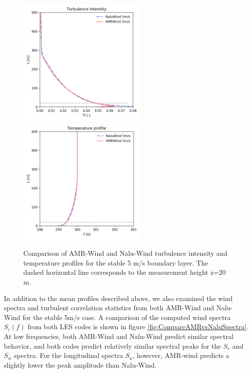 \begin{figure} [hbt!]
  \centering
  \includegraphics[width=2.5in]{figures/Compare_AMRWind_NaluWind/AMRWind_NaluWind_stable_05ms_mesh2p5_2p5_2p5_TI.png}
  \includegraphics[width=2.5in]{figures/Compare_AMRWind_NaluWind/AMRWind_NaluWind_stable_05ms_mesh2p5_2p5_2p5_T.png}
  \caption{\label{fig:CompareAMRvsNaluWind_TTI} Comparison of AMR-Wind
    and Nalu-Wind turbulence intensity and temperature profiles for
    the stable 5 m/s boundary layer. The dashed horizontal line
    corresponds to the measurement height z=20 m.}
\end{figure}

In addition to the mean profiles described above, we also examined the
wind spectra and turbulent correlation statistics from both AMR-Wind
and Nalu-Wind for the stable 5m/s case.  A comparison of the computed
wind spectra $S_i(f)$ from both LES codes is shown in figure
\ref{fig:CompareAMRvsNaluSpectra}.  At low frequencies, both AMR-Wind
and Nalu-Wind predict similar spectral behavior, and both codes
predict relatively similar spectral peaks for the $S_v$ and $S_w$
spectra.  For the longitudinal spectra $S_u$, however, AMR-wind
predicts a slightly lower the peak amplitude than Nalu-Wind.

